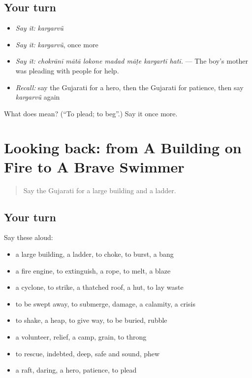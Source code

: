 \subsection*{Your turn}
\begin{itemize}
\raggedright
  \item \emph{Say it:} \emph{kargarvũ}
  \item \emph{Say it:} \emph{kargarvũ}, once more
  \item \emph{Say it:} \emph{chokrānī mātā lokone madad māṭe kargartī hatī.} — The boy's mother was pleading with people for help.
  \item \emph{Recall:} say the Gujarati for a hero, then the Gujarati for patience, then say \emph{kargarvũ} again
\end{itemize}

\begin{tcolorbox}[breakable,colback=teal!4,colframe=teal!35!black,title={Before you move on}]
What does  mean? (\textquotedblleft{}To plead; to beg\textquotedblright{}.) Say it once more.
\end{tcolorbox}
\section[(dialogue)]{Looking back: from A Building on Fire to A Brave Swimmer}

\label{lesson:GU-R308-review-301-308}



\begin{quote}
Say the Gujarati for a large building and a ladder.
\end{quote}

\subsection*{Your turn}
Say these aloud:

\begin{itemize}
\raggedright
  \item a large building, a ladder, to choke, to burst, a bang
  \item a fire engine, to extinguish, a rope, to melt, a blaze
  \item a cyclone, to strike, a thatched roof, a hut, to lay waste
  \item to be swept away, to submerge, damage, a calamity, a crisis
  \item to shake, a heap, to give way, to be buried, rubble
  \item a volunteer, relief, a camp, grain, to throng
  \item to rescue, indebted, deep, safe and sound, phew
  \item a raft, daring, a hero, patience, to plead
\end{itemize}


